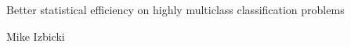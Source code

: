 \begin{frame}{}

\begin{center}
\LARGE
Better statistical efficiency on highly multiclass classification problems
\end{center}
\begin{center}
Mike Izbicki
\end{center}

\vspace{0.05in}

\begin{center}
\end{center}
\end{frame}
